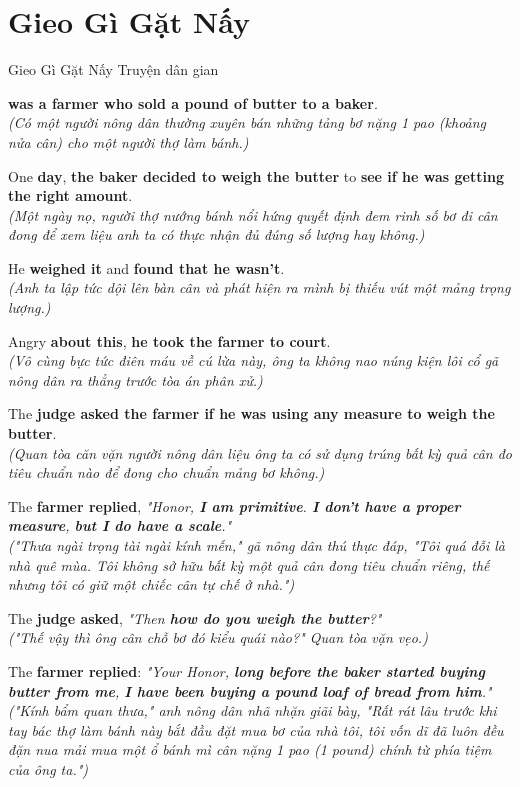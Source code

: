 \section{Gieo Gì Gặt Nấy}
\begin{truyen}{Gieo Gì Gặt Nấy}%
              {Truyện dân gian}

 \textbf{was a farmer who sold a pound of butter to a baker}.\\
\textit{(Có một người nông dân thường xuyên bán những tảng bơ nặng 1 pao (khoảng nửa cân) cho một người thợ làm bánh.)}

One \textbf{day}, \textbf{the baker decided to weigh the butter} to \textbf{see if he was getting the right amount}.\\
\textit{(Một ngày nọ, người thợ nướng bánh nổi hứng quyết định đem rinh số bơ đi cân đong để xem liệu anh ta có thực nhận đủ đúng số lượng hay không.)}

He \textbf{weighed it} and \textbf{found that he wasn't}.\\
\textit{(Anh ta lập tức dội lên bàn cân và phát hiện ra mình bị thiếu vút một mảng trọng lượng.)}

Angry \textbf{about this}, \textbf{he took the farmer to court}.\\
\textit{(Vô cùng bực tức điên máu về cú lừa này, ông ta không nao núng kiện lôi cổ gã nông dân ra thẳng trước tòa án phân xử.)}

The \textbf{judge asked the farmer if he was using any measure to weigh the butter}.\\
\textit{(Quan tòa căn vặn người nông dân liệu ông ta có sử dụng trúng bất kỳ quả cân đo tiêu chuẩn nào để đong cho chuẩn mảng bơ không.)}

The \textbf{farmer replied}, \textit{"Honor, \textbf{I am primitive}. \textbf{I don't have a proper measure}, \textbf{but I do have a scale}."}\\
\textit{("Thưa ngài trọng tài ngài kính mến," gã nông dân thú thực đáp, "Tôi quá đỗi là nhà quê mùa. Tôi không sở hữu bất kỳ một quả cân đong tiêu chuẩn riêng, thế nhưng tôi có giữ một chiếc cân tự chế ở nhà.")}

The \textbf{judge asked}, \textit{"Then \textbf{how do you weigh the butter}?"}\\
\textit{("Thế vậy thì ông cân chỗ bơ đó kiểu quái nào?" Quan tòa vặn vẹo.)}

The \textbf{farmer replied}: \textit{"Your Honor, \textbf{long before the baker started buying butter from me}, \textbf{I have been buying a pound loaf of bread from him}."}\\
\textit{("Kính bẩm quan thưa," anh nông dân nhã nhặn giãi bày, "Rất rát lâu trước khi tay bác thợ làm bánh này bắt đầu đặt mua bơ của nhà tôi, tôi vốn dĩ đã luôn đều đặn nua mải mua một ổ bánh mì cân nặng 1 pao (1 pound) chính từ phía tiệm của ông ta.")}


\end{truyen}
